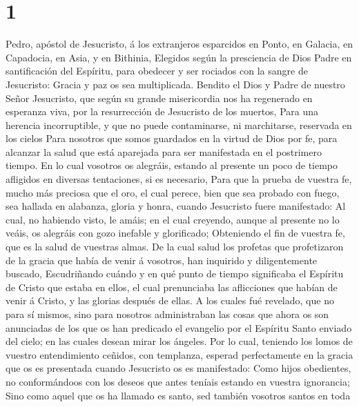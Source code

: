 \hypertarget{section}{%
\section{1}\label{section}}

 Pedro, apóstol de Jesucristo, á los extranjeros esparcidos
en Ponto, en Galacia, en Capadocia, en Asia, y en Bithinia, 
Elegidos según la presciencia de Dios Padre en santificación del
Espíritu, para obedecer y ser rociados con la sangre de Jesucristo:
Gracia y paz os sea multiplicada.  Bendito el Dios y Padre
de nuestro Señor Jesucristo, que según su grande misericordia nos ha
regenerado en esperanza viva, por la resurrección de Jesucristo de los
muertos,  Para una herencia incorruptible, y que no puede
contaminarse, ni marchitarse, reservada en los cielos  Para
nosotros que somos guardados en la virtud de Dios por fe, para alcanzar
la salud que está aparejada para ser manifestada en el postrimero
tiempo.  En lo cual vosotros os alegráis, estando al
presente un poco de tiempo afligidos en diversas tentaciones, si es
necesario,  Para que la prueba de vuestra fe, mucho más
preciosa que el oro, el cual perece, bien que sea probado con fuego, sea
hallada en alabanza, gloria y honra, cuando Jesucristo fuere
manifestado:  Al cual, no habiendo visto, le amáis; en el
cual creyendo, aunque al presente no lo veáis, os alegráis con gozo
inefable y glorificado;  Obteniendo el fin de vuestra fe,
que es la salud de vuestras almas.  De la cual salud los
profetas que profetizaron de la gracia que había de venir á vosotros,
han inquirido y diligentemente buscado,  Escudriñando
cuándo y en qué punto de tiempo significaba el Espíritu de Cristo que
estaba en ellos, el cual prenunciaba las aflicciones que habían de venir
á Cristo, y las glorias después de ellas.  A los cuales fué
revelado, que no para sí mismos, sino para nosotros administraban las
cosas que ahora os son anunciadas de los que os han predicado el
evangelio por el Espíritu Santo enviado del cielo; en las cuales desean
mirar los ángeles.  Por lo cual, teniendo los lomos de
vuestro entendimiento ceñidos, con templanza, esperad perfectamente en
la gracia que os es presentada cuando Jesucristo os es manifestado:
 Como hijos obedientes, no conformándoos con los deseos que
antes teníais estando en vuestra ignorancia;  Sino como
aquel que os ha llamado es santo, sed también vosotros santos en toda
